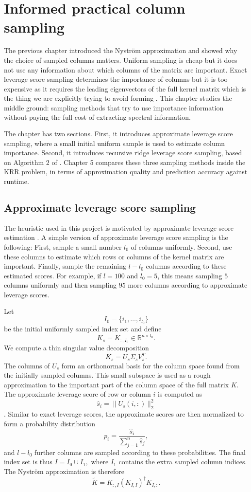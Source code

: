 \chapter{Informed practical column sampling}

The previous chapter introduced the Nystr\"om approximation and showed why the choice of sampled columns matters. Uniform sampling is cheap but it does not use any information about which columns of the matrix are important. Exact leverage score sampling determines the importance of columns but it is too expensive as it requires the leading eigenvectors of the full kernel matrix which is the thing we are explicitly trying to avoid forming \citep{drineas2012fast,alaoui2015fast}. This chapter studies the middle ground: sampling methods that try to use importance information without paying the full cost of extracting spectral information.

The chapter has two sections. First, it introduces approximate leverage score sampling, where a small initial uniform sample is used to estimate column importance. Second, it introduces recursive ridge leverage score sampling, based on Algorithm 2 of \citet{musco2017recursive}. Chapter 5 compares these three sampling methods inside the KRR problem, in terms of approximation quality and prediction accuracy against runtime.


\section{Approximate leverage score sampling}

The heuristic used in this project is motivated by approximate leverage score estimation \citep{drineas2012fast,kumar2012sampling,gittens2016revisiting}. A simple version of approximate leverage score sampling is the following: First, sample a small number $l_0$ of columns uniformly. Second, use these columns to estimate which rows or columns of the kernel matrix are important. Finally, sample the remaining $l-l_0$ columns according to these estimated scores. For example, if $l=100$ and $l_0=5$, this means sampling $5$ columns uniformly and then sampling $95$ more columns according to approximate leverage scores.

Let
\[
I_0=\{i_1,\ldots,i_{l_0}\}
\]
be the initial uniformly sampled index set and define
\[
K_s=K_{:,I_0}\in\mathbb{R}^{n\times l_0}.
\]
We compute a thin singular value decomposition
\[
K_s=U_s\Sigma_s V_s^T.
\]
The columns of $U_s$ form an orthonormal basis for the column space found from the initially sampled columns. This small subspace is used as a rough approximation to the important part of the column space of the full matrix $K$. The approximate leverage score of row or column $i$ is computed as
\[
\hat s_i=\|U_s(i,:)\|_2^2
\] \citep{drineas2012fast,gittens2016revisiting}.
Similar to exact leverage scores, the approximate scores are then normalized to form a probability distribution
\[
p_i=\frac{\hat s_i}{\sum_{j=1}^n \hat s_j},
\]
and $l-l_0$ further columns are sampled according to these probabilities. The final index set is thus $I=I_0\cup I_1,$ where $I_1$ contains the extra sampled column indices. The Nystr\"om approximation is therefore
\[
\tilde K=K_{:,I}(K_{I,I})^\dagger K_{I,:}.
\]


